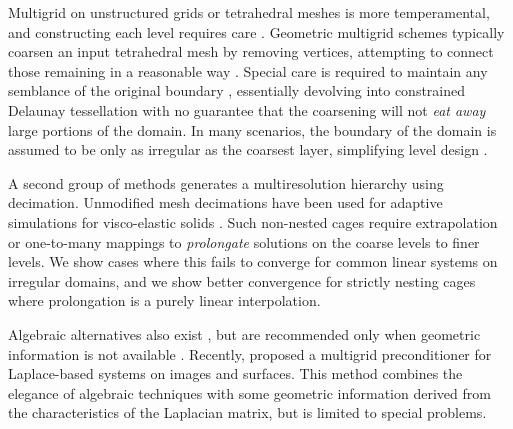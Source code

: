 Multigrid on unstructured grids or tetrahedral meshes is more
temperamental, and constructing each level requires care
\cite{fish1995efficient}.
%
Geometric multigrid schemes typically coarsen an input tetrahedral mesh by
removing vertices, attempting to connect those remaining in a reasonable way
\cite{guillard1993,Adams:1999:PMS}. Special care is required to maintain any
semblance of the original boundary \cite{Brune:2011}, essentially devolving
into constrained Delaunay tessellation with no guarantee that the coarsening
will not \emph{eat away} large portions of the domain.
%
In many scenarios, the boundary of the domain is assumed to be only as
irregular as the coarsest layer, simplifying level design \cite{feng1997non}.

%

A second group of methods generates a multiresolution hierarchy using
decimation. Unmodified mesh decimations \cite{Garland:1997:SSU} have been used
for adaptive simulations for visco-elastic solids \cite{Debunne:2001:DRD}.
%
Such non-nested cages require extrapolation or one-to-many mappings to
\emph{prolongate} solutions on the coarse levels to finer levels.
%
We show cases where this fails to converge for common linear systems on
irregular domains, and we show better convergence for strictly nesting cages
where prolongation is a purely linear interpolation.

Algebraic alternatives also exist
\cite{ruge1987algebraic},
but are recommended only when geometric information is not available
\cite{falgout06}.
%
Recently, \cite{Krishnan:2013:EPL} proposed a
multigrid preconditioner for Laplace-based systems on images and
surfaces.
%
This method combines the elegance of algebraic techniques with some geometric
information derived from the characteristics of the Laplacian matrix, but is
limited to special problems.



